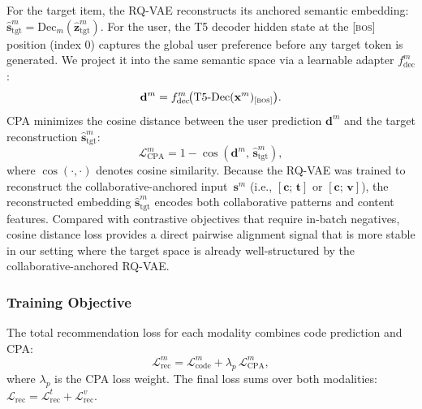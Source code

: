 \documentclass[sigconf, anonymous, review]{acmart}
\begin{document}
For the target item, the RQ-VAE reconstructs its anchored semantic embedding: $\hat{\mathbf{s}}_{\text{tgt}}^m = \mathrm{Dec}_m(\hat{\mathbf{z}}_{\text{tgt}}^m)$.
% 
For the user, the T5 decoder hidden state at the \textsc{[bos]} position (index 0) captures the global user preference before any target token is generated.
%
We project it into the same semantic space via a learnable adapter $f_{\text{dec}}^m$:
\begin{equation}
    \mathbf{d}^m = f_{\text{dec}}^m\!\bigl(\mathrm{T5\text{-}Dec}(\mathbf{x}^m)_{\textsc{[bos]}}\bigr).
\end{equation}
CPA minimizes the cosine distance between the user prediction $\mathbf{d}^m$ and the target reconstruction $\hat{\mathbf{s}}_{\text{tgt}}^m$:
\begin{equation}
    \mathcal{L}_{\text{CPA}}^m = 1 - \cos(\mathbf{d}^m,\, \hat{\mathbf{s}}_{\text{tgt}}^m),
    \label{eq:cpa}
\end{equation}
where $\cos(\cdot,\cdot)$ denotes cosine similarity.
% 
Because the RQ-VAE was trained to reconstruct the collaborative-anchored input~$\mathbf{s}^m$ (i.e., $[\mathbf{c};\,\mathbf{t}]$ or $[\mathbf{c};\,\mathbf{v}]$), the reconstructed embedding $\hat{\mathbf{s}}_{\text{tgt}}^m$ encodes both collaborative patterns and content features.
%
Compared with contrastive objectives that require in-batch negatives, cosine distance loss provides a direct pairwise alignment signal that is more stable in our setting where the target space is already well-structured by the collaborative-anchored RQ-VAE.

\subsubsection{Training Objective}
\label{sec:train_obj}

The total recommendation loss for each modality combines code prediction and CPA:
\begin{equation}
    \mathcal{L}_{\text{rec}}^m = \mathcal{L}_{\text{code}}^m + \lambda_p\,\mathcal{L}_{\text{CPA}}^m,
    \label{eq:rec}
\end{equation}
where $\lambda_p$ is the CPA loss weight.
% 
The final loss sums over both modalities: $\mathcal{L}_{\text{rec}} = \mathcal{L}_{\text{rec}}^t + \mathcal{L}_{\text{rec}}^v$.

\end{document}
